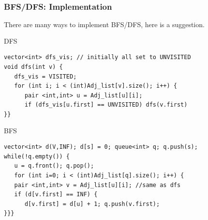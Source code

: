 \documentclass{beamer}
\begin{document}
\begin{frame}
  \frametitle{BFS/DFS: Implementation}
  {\smaller
  There are many ways to implement BFS/DFS, here is a suggestion.

  \begin{exampleblock}{DFS}
\begin{verbatim}
vector<int> dfs_vis; // initially all set to UNVISITED
void dfs(int v) {
   dfs_vis = VISITED;
   for (int i; i < (int)Adj_list[v].size(); i++) {
      pair <int,int> u = Adj_list[u][i];
      if (dfs_vis[u.first] == UNVISITED) dfs(v.first)      
}}
\end{verbatim}
  \end{exampleblock}
  \begin{exampleblock}{BFS}
\begin{verbatim}
vector<int> d(V,INF); d[s] = 0; queue<int> q; q.push(s);
while(!q.empty()) {
   u = q.front(); q.pop();
   for (int i=0; i < (int)Adj_list[q].size(); i++) {
   pair <int,int> v = Adj_list[u][i]; //same as dfs
   if (d[v.first] == INF) {   
      d[v.first] = d[u] + 1; q.push(v.first);
}}}
\end{verbatim}
  \end{exampleblock}
  

  }
\end{frame}
\end{document}
